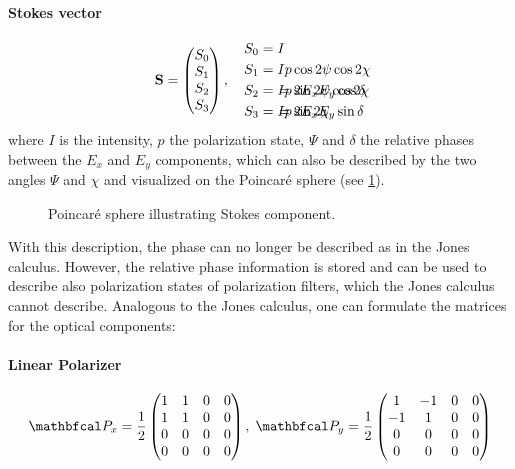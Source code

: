 \paragraph{Stokes vector}
\begin{align}
% 
\vec{S} =
\begin{pmatrix} S_0 \\ S_1 \\ S_2 \\ S_3\end{pmatrix} , \quad
% 
\begin{split}
S_0 &= I \\
S_1 &= I p \cos 2\psi \cos 2\chi \\
S_2 &= I p \sin 2\psi \cos 2\chi \\
S_3 &= I p \sin 2\chi
\end{split}
% 
\hspace{-7em}
% 
\begin{split}
& \\
& \\
&= 2 E_x E_y \cos \delta \\
&= 2 E_x E_y \sin \delta
\end{split}
\end{align}
%
where $I$ is the intensity, $p$ the polarization state, $\Psi$ and $\delta$ the relative phases between the $E_x$ and $E_y$ components, which can also be described by the two angles $\Psi$ and $\chi$ and visualized on the Poincar\'{e} sphere (see \cref{fig:stokesPoincare}).
%
\begin{figure}[!t]
\centering
{}
\caption{Poincar\'{e} sphere illustrating Stokes component.}
\label{fig:stokesPoincare}
\end{figure}
% 
With this description, the phase can no longer be described as in the Jones calculus.
However, the relative phase information is stored and can be used to describe also polarization states of polarization filters, which the Jones calculus cannot describe.
Analogous to the Jones calculus, one can formulate the matrices for the optical components:
%
\paragraph{Linear Polarizer}
\begin{align}
\mat{P}_x=\frac{1}{2}
\begin{pmatrix}
    1 & 1 & 0 & 0 \\
    1 & 1 & 0 & 0 \\
    0 & 0 & 0 & 0 \\
    0 & 0 & 0 & 0
  \end{pmatrix}
, \;
\mat{P}_y=\frac{1}{2}
\begin{pmatrix}
     1 & -1 & 0 & 0 \\
    -1 &  1 & 0 & 0 \\
     0 &  0 & 0 & 0 \\
     0 &  0 & 0 & 0
\end{pmatrix}
\end{align}
%
